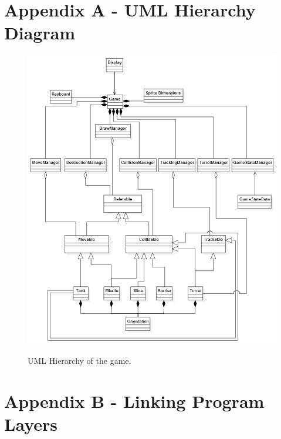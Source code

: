 \documentclass[10pt,a4paper]{report}
\author{Daniel G. Holmes}
\begin{document}
\thispagestyle{empty}

\section*{Appendix A - UML Hierarchy Diagram}


\begin{figure}[h]
	\centering
		\includegraphics[keepaspectratio=true, scale=0.73]{uml-hierarchy}
	\label{top}
	\caption{UML Hierarchy of the game.}
	\setcounter{figure}{0}
\end{figure}

\newpage
\thispagestyle{empty}
\section*{Appendix B - Linking Program Layers}
\end{document}

